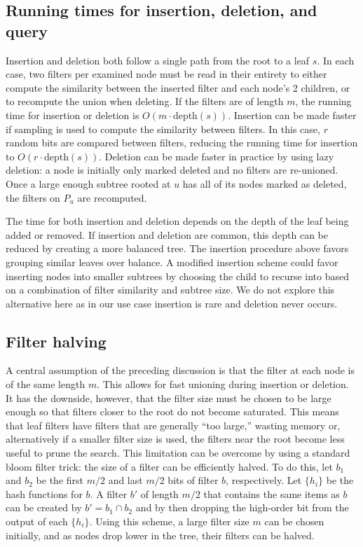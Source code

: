 \documentclass[11pt]{article}
\begin{document}
\subsection{Running times for insertion, deletion, and query}

Insertion and deletion both follow a single path from the root to a leaf $s$. In each case, two filters per examined node must be read in their entirety to either compute the similarity between the inserted filter and each node's 2 children, or to recompute the union when deleting. If the filters are of length $m$, the running time for insertion or deletion is $O(m\cdot\text{depth}(s))$.  Insertion can be made faster if sampling is used to compute the similarity between filters. In this case, $r$ random bits are compared between filters, reducing the running time for insertion to $O(r\cdot\text{depth}(s))$. Deletion can be made faster in practice by using lazy deletion: a node is initially only marked deleted and no filters are re-unioned. Once a large enough subtree rooted at $u$ has all of its nodes marked as deleted, the filters on $P_u$ are recomputed. 

The time for both insertion and deletion depends on the depth of the leaf being added or removed. If insertion and deletion are common, this depth can be reduced by creating a more balanced tree. The insertion procedure above favors grouping similar leaves over balance. A modified insertion scheme could favor inserting nodes into smaller subtrees by choosing the child to recurse into based on a combination of filter similarity and subtree size. We do not explore this alternative here as in our use case insertion is rare and deletion never occurs.

\subsection{Filter halving}

A central assumption of the preceding discussion is that the filter at each node is of the same length $m$. This allows for fast unioning during insertion or deletion. It has the downside, however, that the filter size must be chosen to be large enough so that filters closer to the root do not become saturated. This means that leaf filters have filters that are generally ``too large,'' wasting memory or, alternatively if a smaller filter size is used, the filters near the root become less useful to prune the search. This limitation can be overcome by using a standard bloom filter trick: the size of a filter can be efficiently halved. To do this, let $b_1$ and $b_2$ be the first $m/2$ and last $m/2$ bits of filter $b$, respectively.  Let $\{h_i\}$ be the hash functions for $b$. A filter $b'$ of length $m/2$ that contains the same items as $b$ can be created by $b' = b_1 \cap b_2$ and by then dropping the high-order bit from the output of each $\{h_i\}$.  Using this scheme, a large filter size $m$ can be chosen initially, and as nodes drop lower in the tree, their filters can be halved. 
\end{document}
